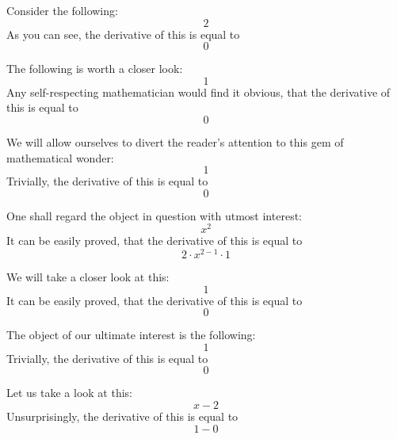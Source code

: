 \documentclass{article}
\begin{document}
Consider the following:
\begin{equation}
2 
\end{equation}
As you can see, the derivative of this is equal to
\begin{equation}
0 
\end{equation}

The following is worth a closer look:
\begin{equation}
1 
\end{equation}
Any self-respecting mathematician would find it obvious, that the derivative of this is equal to
\begin{equation}
0 
\end{equation}

We will allow ourselves to divert the reader's attention to this gem of mathematical wonder:
\begin{equation}
1 
\end{equation}
Trivially, the derivative of this is equal to
\begin{equation}
0 
\end{equation}

One shall regard the object in question with utmost interest:
\begin{equation}
x ^{2 } 
\end{equation}
It can be easily proved, that the derivative of this is equal to
\begin{equation}
2 \cdot x ^{2 - 1 } \cdot 1 
\end{equation}

We will take a closer look at this:
\begin{equation}
1 
\end{equation}
It can be easily proved, that the derivative of this is equal to
\begin{equation}
0 
\end{equation}

The object of our ultimate interest is the following:
\begin{equation}
1 
\end{equation}
Trivially, the derivative of this is equal to
\begin{equation}
0 
\end{equation}

Let us take a look at this:
\begin{equation}
x - 2 
\end{equation}
Unsurprisingly, the derivative of this is equal to
\begin{equation}
1 - 0 
\end{equation}
\end{document}
